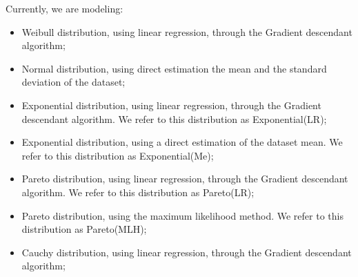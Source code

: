 Currently, we are modeling:

\begin{itemize}
	\item Weibull distribution, using linear regression, through the Gradient descendant algorithm;
	\item Normal distribution, using direct estimation the mean and the standard deviation of the dataset;
	\item Exponential distribution, using linear regression, through the Gradient descendant algorithm. We refer to this distribution as Exponential(LR);
	\item Exponential distribution, using a direct estimation of the dataset mean. We refer to this distribution as Exponential(Me);
	\item Pareto distribution, using linear regression, through the Gradient descendant algorithm. We refer to this distribution as Pareto(LR);
	\item Pareto distribution, using the maximum likelihood method. We refer to this distribution as Pareto(MLH);
	\item Cauchy distribution, using linear regression, through the Gradient descendant algorithm;
\end{itemize}







